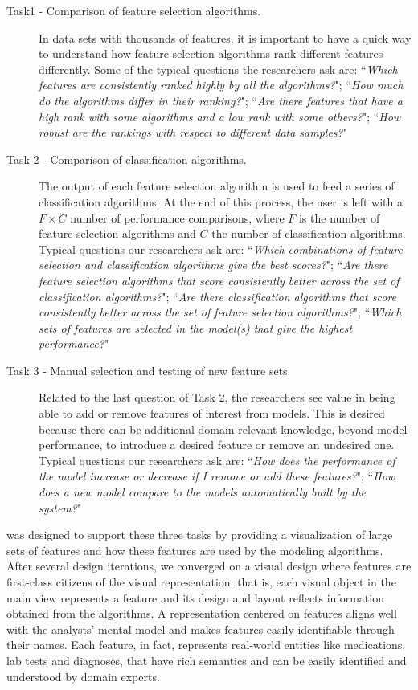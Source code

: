 \begin{description}
\item[Task1 - Comparison of feature selection algorithms.] In data sets with thousands of features, it is important to have a quick way to understand how feature selection algorithms rank different features differently. Some of the typical questions the researchers ask are: ``\textit{Which features are consistently ranked highly by all the algorithms?}"; ``\textit{How much do the algorithms differ in their ranking?}"; ``\textit{Are there features that have a high rank with some algorithms and a low rank with some others?}"; ``\textit{How robust are the rankings with respect to different data samples?}"

\item[Task 2 - Comparison of classification algorithms.] The output of each feature selection algorithm is used to feed a series of classification algorithms. At the end of this process, the user is left with a $F \times C$ number of performance comparisons, where $F$ is the number of feature selection algorithms and $C$ the number of classification algorithms. Typical questions our researchers ask are: ``\textit{Which combinations of feature selection and classification algorithms give the best scores?}"; ``\textit{Are there feature selection algorithms that score consistently better across the set of classification algorithms?}"; ``\textit{Are there classification algorithms that score consistently better across the set of feature selection algorithms?}"; ``\textit{Which sets of features are selected in the model(s) that give the highest performance?}"

\item[Task 3 - Manual selection and testing of new feature sets.] Related to the last question of Task 2, the researchers see value in being able to add or remove features of interest from models. This is desired because there can be additional domain-relevant knowledge, beyond model performance, to introduce a desired feature or remove an undesired one.  Typical questions our researchers ask are: ``\textit{How does the performance of the model increase or decrease if I remove or add these features?}"; ``\textit{How does a new model compare to the models automatically built by the system?}"
\end{description}


\infuse was designed to support these three tasks by providing a visualization of large sets of features and how these features are used by the modeling algorithms. After several design iterations, we converged on a visual design where features are first-class citizens of the visual representation: that is, each visual object in the main view represents a feature and its design and layout reflects information obtained from the algorithms.  A representation centered on features aligns well with the analysts' mental model and makes features easily identifiable through their names. Each feature, in fact, represents real-world entities like medications, lab tests and diagnoses, that have rich semantics and can be easily identified and understood by domain experts.
